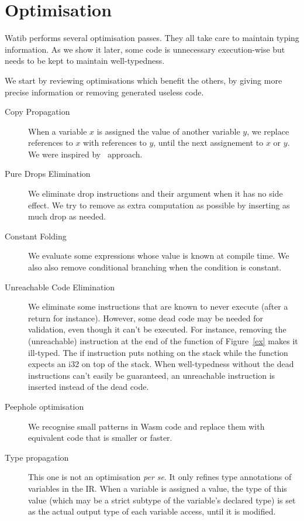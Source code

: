 \documentclass[a4paper,11pt]{article}
\begin{document}
\section{Optimisation}\label{opt}
\textsf{Watib} performs several optimisation passes. They all take care to
maintain typing information. As we show it later, some code is unnecessary
execution-wise but needs to be kept to maintain well-typedness.

We start by reviewing optimisations which benefit the others, by giving more
precise information or removing generated useless code.

\begin{description}
  \item[Copy Propagation] When a variable $x$ is assigned the value of another
    variable $y$, we replace references to $x$ with references to $y$, until the
    next assignement to $x$ or $y$. We were inspired
    by~\cite[Section~12.5]{muchnick1997advanced} approach.
  \item[Pure Drops Elimination] We eliminate \textsf{drop} instructions and
    their argument when it has no side effect. We try to remove as extra
    computation as possible by inserting as much \textsf{drop} as needed.
  \item[Constant Folding] We evaluate some expressions whose value is known at
    compile time. We also also remove conditional branching when the condition
    is constant.
  \item[Unreachable Code Elimination] We eliminate some instructions that are
    known to never execute (after a \textsf{return} for instance). However, some
    dead code may be needed for validation, even though it can't be executed.
    For instance, removing the \textsf{(unreachable)} instruction at the end of
    the function of Figure~\ref{ex} makes it ill-typed. The \textsf{if}
    instruction puts nothing on the stack while the function expects an
    \textsf{i32} on top of the stack. When well-typedness without the dead
    instructions can't easily be guaranteed, an \textsf{unreachable} instruction
    is inserted instead of the dead code.
  \item[Peephole optimisation] We recognise small patterns in Wasm code and
    replace them with equivalent code that is smaller or faster.
  \item[Type propagation] This one is not an optimisation \emph{per se}. It only
    refines type annotations of variables in the IR. When a variable is assigned
    a value, the type of this value (which may be a strict subtype of the
    variable's declared type) is set as the actual output type of each variable
    access, until it is modified.
\end{description}
\end{document}
